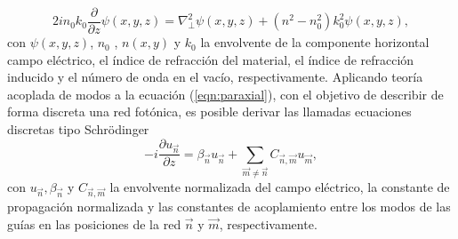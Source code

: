 \begin{equation}
	2in_0k_0\frac{\partial}{\partial z}\psi(x,y,z) = \nabla_\perp^2 \psi (x,y,z) + \left(n^2-n_0^2\right)k_0^2 \psi (x,y,z), \label{eqn:paraxial}
\end{equation}
con $\psi(x,y,z)$, $n_0$ , $n(x,y)$ y $k_0$ la envolvente de la componente horizontal campo eléctrico, el índice de refracción del material, el índice de refracción inducido y el número de onda en el vacío, respectivamente. Aplicando teoría acoplada de modos \cite{coupledmodetheory} a la ecuación (\ref{eqn:paraxial}), con el objetivo de describir de forma discreta una red fotónica, es posible derivar las llamadas ecuaciones discretas tipo Schrödinger \cite{discretesolitons, artificialFB, FBdynamics}
\begin{equation}
	-i\frac{\partial u_{\vec{n}} }{\partial z} = \beta_{\vec{n}}u_{\vec{n}} + \sum_{\vec{m}\neq\vec{n}} C_{\vec{n},\vec{m}}u_{\vec{m}}, \label{eqn:CMT}
\end{equation}
con $u_{\vec{n}}, \beta_{\vec{n}}$ y $C_{\vec{n}, \vec{m}}$ la envolvente normalizada del campo eléctrico, la constante de propagación normalizada y las constantes de acoplamiento entre los modos de las guías en las posiciones de la red $\vec{n}$ y $\vec{m}$, respectivamente.